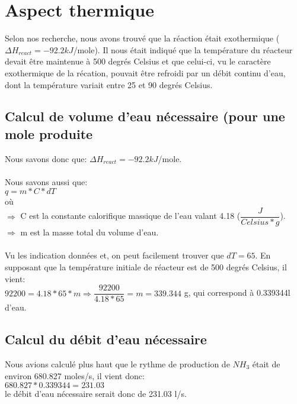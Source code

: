 \documentclass[11pt,a4paper]{report}
\begin{document}
\section{Aspect thermique}
Selon nos recherche, nous avons trouvé que la réaction était exothermique ($\Delta H_{react} = -92.2kJ$/mole). Il nous était indiqué que la température du réacteur devait être maintenue à 500 degrés Celsius et que celui-ci, vu le caractère exothermique de la récation, pouvait être refroidi par un débit continu d'eau, dont la température variait entre 25 et 90 degrés Celsius.

\subsection{Calcul de volume d'eau nécessaire (pour une mole produite}
Nous savons donc que: $\Delta H_{react} = -92.2kJ$/mole. \\ \\
Nous savons aussi que:\\
 $q = m*C*dT$ \\
 où\\
 $\Rightarrow$ C est la constante calorifique massique de l'eau valant 4.18 ($\dfrac{J}{Celsius *g}$). \\
$\Rightarrow$  m est la masse total du volume d'eau.\\
\\
 Vu les indication données et, on peut facilement trouver que $dT=65$. En supposant que la température initiale de réacteur est de 500 degrés Celsius, il vient: \\
$92200 = 4.18*65*m \Rightarrow \dfrac{92200}{4.18*65} = m = 339.344$ g, qui correspond à 0.339344l d'eau.

\subsection{Calcul du débit d'eau nécessaire}
Nous avions calculé plus haut que le rythme de production de $NH_3$ était de environ 680.827 moles/s, il vient donc: \\
$680.827*0.339344 = 231.03$ \\
le débit d'eau nécessaire serait donc de 231.03 l/s.
\end{document}
